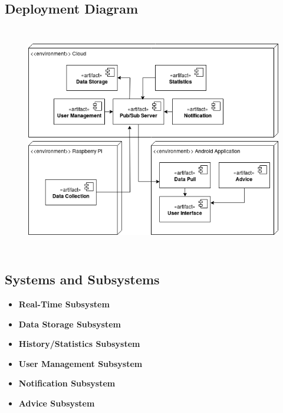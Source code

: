 \subsection{Deployment Diagram}
\begin{center}
\begin{figure}[h]
	\includegraphics[width=15cm, height=10cm]{OverallDescription/DeploymentDiagram.png}
\end{figure}
\end{center}

\subsection{Systems and Subsystems}
\begin{itemize}
	\item \textbf{Real-Time Subsystem}
	\item \textbf{Data Storage Subsystem}
	\item \textbf{History/Statistics Subsystem}
	\item \textbf{User Management Subsystem}
	\item \textbf{Notification Subsystem}
	\item \textbf{Advice Subsystem}
\end{itemize}